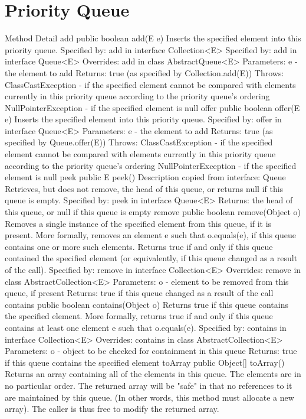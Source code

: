 \documentclass{book}
\begin{document}
\section{Priority Queue}
Method Detail
add
public boolean add(E e)
Inserts the specified element into this priority queue.
Specified by:
add in interface Collection<E>
Specified by:
add in interface Queue<E>
Overrides:
add in class AbstractQueue<E>
Parameters:
e - the element to add
Returns:
true (as specified by Collection.add(E))
Throws:
ClassCastException - if the specified element cannot be compared with elements currently in this priority queue according to the priority queue's ordering
NullPointerException - if the specified element is null
offer
public boolean offer(E e)
Inserts the specified element into this priority queue.
Specified by:
offer in interface Queue<E>
Parameters:
e - the element to add
Returns:
true (as specified by Queue.offer(E))
Throws:
ClassCastException - if the specified element cannot be compared with elements currently in this priority queue according to the priority queue's ordering
NullPointerException - if the specified element is null
peek
public E peek()
Description copied from interface: Queue
Retrieves, but does not remove, the head of this queue, or returns null if this queue is empty.
Specified by:
peek in interface Queue<E>
Returns:
the head of this queue, or null if this queue is empty
remove
public boolean remove(Object o)
Removes a single instance of the specified element from this queue, if it is present. More formally, removes an element e such that o.equals(e), if this queue contains one or more such elements. Returns true if and only if this queue contained the specified element (or equivalently, if this queue changed as a result of the call).
Specified by:
remove in interface Collection<E>
Overrides:
remove in class AbstractCollection<E>
Parameters:
o - element to be removed from this queue, if present
Returns:
true if this queue changed as a result of the call
contains
public boolean contains(Object o)
Returns true if this queue contains the specified element. More formally, returns true if and only if this queue contains at least one element e such that o.equals(e).
Specified by:
contains in interface Collection<E>
Overrides:
contains in class AbstractCollection<E>
Parameters:
o - object to be checked for containment in this queue
Returns:
true if this queue contains the specified element
toArray
public Object[] toArray()
Returns an array containing all of the elements in this queue. The elements are in no particular order.
The returned array will be "safe" in that no references to it are maintained by this queue. (In other words, this method must allocate a new array). The caller is thus free to modify the returned array.
\end{document}
